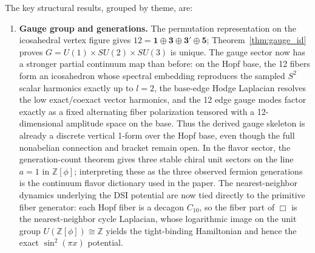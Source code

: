 \documentclass[12pt,a4paper]{article}
\theoremstyle{definition}
\begin{document}
The key structural results, grouped by theme, are:

\begin{enumerate}
\item \textbf{Gauge group and generations.}  The permutation representation on the icosahedral vertex figure gives $12 = \mathbf{1} \oplus \mathbf{3} \oplus \mathbf{3'} \oplus \mathbf{5}$; Theorem~\ref{thm:gauge_id} proves $G = U(1) \times SU(2) \times SU(3)$ is unique.  The gauge sector now has a stronger partial continuum map than before: on the Hopf base, the 12 fibers form an icosahedron whose spectral embedding reproduces the sampled $S^2$ scalar harmonics exactly up to $l=2$, the base-edge Hodge Laplacian resolves the low exact/coexact vector harmonics, and the 12 edge gauge modes factor exactly as a fixed alternating fiber polarization tensored with a 12-dimensional amplitude space on the base.  Thus the derived gauge skeleton is already a discrete vertical 1-form over the Hopf base, even though the full nonabelian connection and bracket remain open.  In the flavor sector, the generation-count theorem gives three stable chiral unit sectors on the line $a=1$ in $\mathbb{Z}[\phi]$; interpreting these as the three observed fermion generations is the continuum flavor dictionary used in the paper.  The nearest-neighbor dynamics underlying the DSI potential are now tied directly to the primitive fiber generator: each Hopf fiber is a decagon $C_{10}$, so the fiber part of $\Box$ is the nearest-neighbor cycle Laplacian, whose logarithmic image on the unit group $U(\mathbb{Z}[\phi]) \cong \mathbb{Z}$ yields the tight-binding Hamiltonian and hence the exact $\sin^2(\pi x)$ potential.


\end{enumerate}
\end{document}
